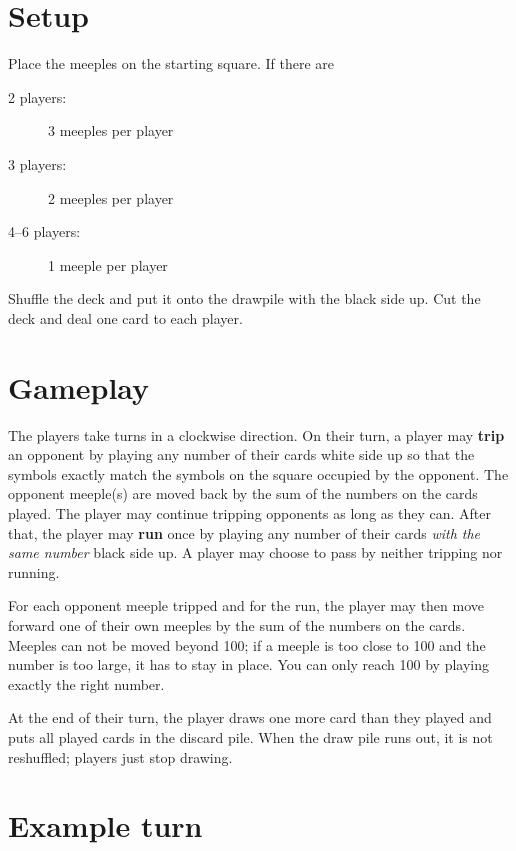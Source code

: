 \documentclass{article}
\begin{document}
\section*{Setup}

Place the meeples on the starting square. If there are

\begin{description}

\item[2 players:] 3 meeples per player

\item[3 players:] 2 meeples per player

\item[4--6 players:] 1 meeple per player

\end{description}

Shuffle the deck and put it onto the drawpile with the black side up. Cut the deck and deal one card to each player.

\section*{Gameplay}

The players take turns in a clockwise direction. On their turn, a player may \textbf{trip} an opponent by playing any number of their cards white side up so that the symbols exactly match the symbols on the square occupied by the opponent. The opponent meeple(s) are moved back by the sum of the numbers on the cards played. The player may continue tripping opponents as long as they can. After that, the player may \textbf{run} once by playing any number of their cards \textit{with the same number} black side up. A player may choose to pass by neither tripping nor running.

For each opponent meeple tripped and for the run, the player may then move forward one of their own meeples by the sum of the numbers on the cards. Meeples can not be moved beyond 100; if a meeple is too close to 100 and the number is too large, it has to stay in place. You can only reach 100 by playing exactly the right number.

At the end of their turn, the player draws one more card than they played and puts all played cards in the discard pile. When the draw pile runs out, it is not reshuffled; players just stop drawing.

\section*{Example turn}
\end{document}
